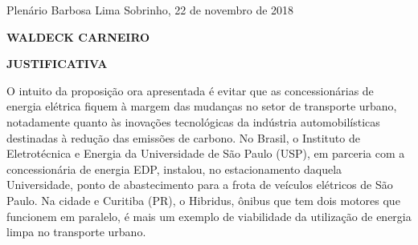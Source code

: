 \documentclass[10pt]{article}
\begin{document}
\begin{center}
  Plenário Barbosa Lima Sobrinho, 22 de novembro de 2018

   \bigskip

  \textbf{ WALDECK CARNEIRO}

  \bigskip

  \textbf{JUSTIFICATIVA}
  \bigskip

\end{center}

   O intuito da proposição ora apresentada é evitar que as concessionárias de energia elétrica fiquem à margem das mudanças no setor de transporte urbano, notadamente quanto às inovações tecnológicas da indústria automobilísticas destinadas à redução das emissões de carbono. No Brasil, o Instituto de Eletrotécnica e Energia da Universidade de São Paulo (USP), em parceria com a concessionária de energia EDP, instalou, no estacionamento daquela Universidade, ponto de abastecimento para a frota de veículos elétricos de São Paulo. Na cidade e Curitiba (PR), o Hibridus, ônibus que tem dois motores que funcionem em paralelo, é mais um exemplo de viabilidade da utilização de energia limpa no transporte urbano.



\iffalse
\begin{center}
  \textbf{REFERÊNCIAS}
\end{center}


\fi
\end{document}
